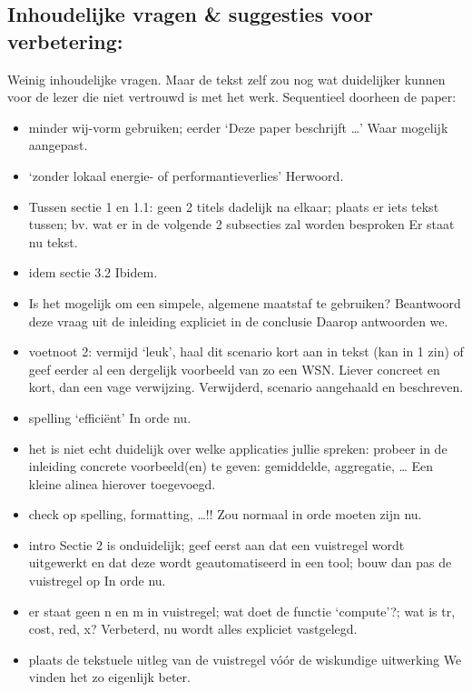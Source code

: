 \documentclass[11pt]{article}
\begin{document}
\subsection{Inhoudelijke vragen \& suggesties voor verbetering:}

Weinig inhoudelijke vragen. Maar de tekst zelf zou nog wat duidelijker kunnen voor de lezer die niet vertrouwd is met het werk. Sequentieel doorheen de paper:
\begin{itemize}
\item minder wij-vorm gebruiken; eerder ‘Deze paper beschrijft …’ {\color{red} Waar mogelijk aangepast.}
\item ‘zonder lokaal energie- of performantieverlies’ {\color{red} Herwoord.}
\item Tussen sectie 1 en 1.1: geen 2 titels dadelijk na elkaar; plaats er iets tekst tussen; bv. wat er in de volgende 2 subsecties zal worden besproken {\color{red} Er staat nu tekst.}
\item idem sectie 3.2 {\color{red} Ibidem. }
\item Is het mogelijk om een simpele, algemene maatstaf te gebruiken? Beantwoord deze vraag uit de inleiding expliciet in de conclusie {\color{red} Daarop antwoorden we.}
\item voetnoot 2: vermijd ‘leuk’, haal dit scenario kort aan in tekst (kan in 1 zin) of geef eerder al een dergelijk voorbeeld van zo een WSN. Liever concreet en kort, dan een vage verwijzing. {\color{red} Verwijderd, scenario aangehaald en beschreven.}
\item spelling ‘efficiënt’ {\color{red} In orde nu.}
\item het is niet echt duidelijk over welke applicaties jullie spreken: probeer in de inleiding concrete voorbeeld(en) te geven: gemiddelde, aggregatie, … {\color{red} Een kleine alinea hierover toegevoegd.}
\item check op spelling, formatting, …!! {\color{red} Zou normaal in orde moeten zijn nu.}
\item intro Sectie 2 is onduidelijk; geef eerst aan dat een vuistregel wordt uitgewerkt en dat deze wordt geautomatiseerd in een tool; bouw dan pas de vuistregel op {\color{red} In orde nu.}
\item er staat geen n en m in vuistregel; wat doet de functie ‘compute’?; wat is tr, cost, red, x? {\color{red} Verbeterd, nu wordt alles expliciet vastgelegd.}
\item plaats de tekstuele uitleg van de vuistregel vóór de wiskundige uitwerking {\color{red} We vinden het zo eigenlijk beter.}

\end{itemize}
\end{document}
